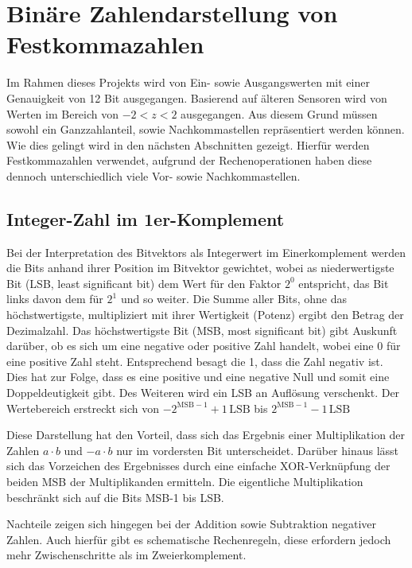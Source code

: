 \section{Binäre Zahlendarstellung von Festkommazahlen}

Im Rahmen dieses Projekts wird von Ein- sowie Ausgangswerten mit einer Genauigkeit von 12 Bit ausgegangen.
Basierend auf älteren Sensoren wird von Werten im Bereich von $-2 < z < 2$ ausgegangen.
Aus diesem Grund müssen sowohl ein Ganzzahlanteil, sowie Nachkommastellen repräsentiert werden können. Wie dies gelingt wird in den nächsten Abschnitten gezeigt.
Hierfür werden Festkommazahlen verwendet, aufgrund der Rechenoperationen haben diese dennoch unterschiedlich viele Vor- sowie Nachkommastellen.


\subsection{Integer-Zahl im 1er-Komplement}
Bei der Interpretation des Bitvektors als Integerwert im Einerkomplement werden die Bits anhand ihrer Position im Bitvektor gewichtet, wobei as niederwertigste Bit 
(LSB, least significant bit) dem Wert für den Faktor $2^0$ entspricht, das Bit links davon dem für $2^1$ und so weiter. Die Summe aller Bits, ohne das höchstwertigste, 
multipliziert mit ihrer Wertigkeit (Potenz) ergibt den Betrag der Dezimalzahl. Das höchstwertigste Bit (MSB, most significant bit) gibt Auskunft darüber, ob es sich 
um eine negative oder positive Zahl handelt, wobei eine 0 für eine positive Zahl steht. Entsprechend besagt die 1, dass die Zahl negativ ist.
Dies hat zur Folge, dass es eine positive und eine negative Null und somit eine Doppeldeutigkeit gibt. Des Weiteren wird
ein LSB an Auflösung verschenkt. Der Wertebereich erstreckt sich von $-2^{\mathrm{MSB}-1}+1\,\mathrm{LSB}$ bis $2^{\mathrm{MSB}-1}-1\,\mathrm{LSB}$

Diese Darstellung hat den Vorteil, dass sich das Ergebnis einer Multiplikation der Zahlen $a \cdot b$ und $-a \cdot b$ nur im vordersten Bit unterscheidet. Darüber hinaus
lässt sich das Vorzeichen des Ergebnisses durch eine einfache XOR-Verknüpfung der beiden MSB der Multiplikanden ermitteln. 
Die eigentliche Multiplikation beschränkt sich auf die Bits MSB-1 bis LSB.

Nachteile zeigen sich hingegen bei der Addition sowie Subtraktion negativer Zahlen. Auch hierfür gibt es schematische Rechenregeln, diese erfordern jedoch mehr 
Zwischenschritte als im Zweierkomplement. 


